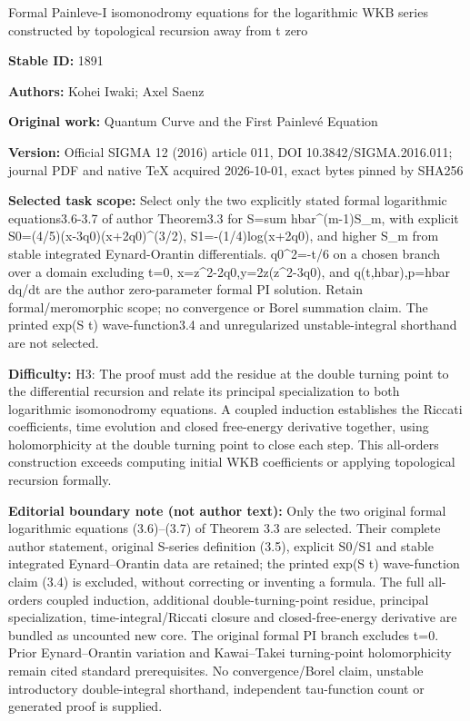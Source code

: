 \documentclass[11pt]{article}
\theoremstyle{definition}
\numberwithin{equation}{section}
\begin{document}
\begin{center}\Large Formal Painleve-I isomonodromy equations for the logarithmic WKB series constructed by topological recursion away from t zero\end{center}
\noindent\textbf{Stable ID:} 1891\par
\noindent\textbf{Authors:} Kohei Iwaki; Axel Saenz\par
\noindent\textbf{Original work:} Quantum Curve and the First Painlevé Equation\par
\noindent\textbf{Version:} Official SIGMA 12 (2016) article 011, DOI 10.3842/SIGMA.2016.011; journal PDF and native TeX acquired 2026-10-01, exact bytes pinned by SHA256\par
\noindent\textbf{Selected task scope:} Select only the two explicitly stated formal logarithmic equations3.6-3.7 of author Theorem3.3 for S=\allowbreak{}sum hbar\textasciicircum{}(m-1)S\_m, with explicit S0=\allowbreak{}(4/5)(x-3q0)(x+\allowbreak{}2q0)\textasciicircum{}(3/2), S1=\allowbreak{}-(1/4)log(x+\allowbreak{}2q0), and higher S\_m from stable integrated Eynard-Orantin differentials. q0\textasciicircum{}2=\allowbreak{}-t/6 on a chosen branch over a domain excluding t=\allowbreak{}0, x=\allowbreak{}z\textasciicircum{}2-2q0,y=\allowbreak{}2z(z\textasciicircum{}2-3q0), and q(t,hbar),p=\allowbreak{}hbar dq/dt are the author zero-parameter formal PI solution. Retain formal/meromorphic scope; no convergence or Borel summation claim. The printed exp(S t) wave-function3.4 and unregularized unstable-integral shorthand are not selected.\par
\noindent\textbf{Difficulty:} H3: The proof must add the residue at the double turning point to the differential recursion and relate its principal specialization to both logarithmic isomonodromy equations. A coupled induction establishes the Riccati coefficients, time evolution and closed free-energy derivative together, using holomorphicity at the double turning point to close each step. This all-orders construction exceeds computing initial WKB coefficients or applying topological recursion formally.\par
\noindent\textbf{Editorial boundary note (not author text):} Only the two original formal logarithmic equations (3.6)–(3.7) of Theorem 3.3 are selected. Their complete author statement, original S-series definition (3.5), explicit S0/S1 and stable integrated Eynard–Orantin data are retained; the printed exp(S t) wave-function claim (3.4) is excluded, without correcting or inventing a formula. The full all-orders coupled induction, additional double-turning-point residue, principal specialization, time-integral/Riccati closure and closed-free-energy derivative are bundled as uncounted new core. The original formal PI branch excludes t=\allowbreak{}0. Prior Eynard–Orantin variation and Kawai–Takei turning-point holomorphicity remain cited standard prerequisites. No convergence/Borel claim, unstable introductory double-integral shorthand, independent tau-function count or generated proof is supplied.\par
\end{document}
